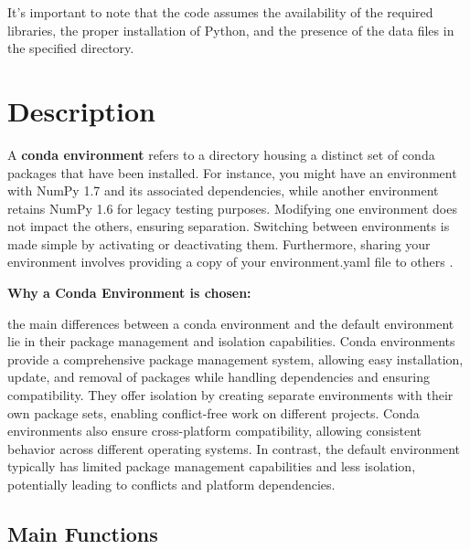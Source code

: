 It's important to note that the code assumes the availability of the required libraries, the proper installation of Python, and the presence of the data files in the specified directory. 


\section{Description}

A \textbf{conda environment} refers to a directory housing a distinct set of conda packages that have been installed. For instance, you might have an environment with NumPy 1.7 and its associated dependencies, while another environment retains NumPy 1.6 for legacy testing purposes. Modifying one environment does not impact the others, ensuring separation. Switching between environments is made simple by activating or deactivating them. Furthermore, sharing your environment involves providing a copy of your environment.yaml file to others \cite{Conda-environments:2023}.

\textbf{Why a Conda Environment is chosen:}

the main differences between a conda environment and the default environment lie in their package management and isolation capabilities. Conda environments provide a comprehensive package management system, allowing easy installation, update, and removal of packages while handling dependencies and ensuring compatibility. They offer isolation by creating separate environments with their own package sets, enabling conflict-free work on different projects. Conda environments also ensure cross-platform compatibility, allowing consistent behavior across different operating systems. In contrast, the default environment typically has limited package management capabilities and less isolation, potentially leading to conflicts and platform dependencies. 

\subsection{Main Functions}

